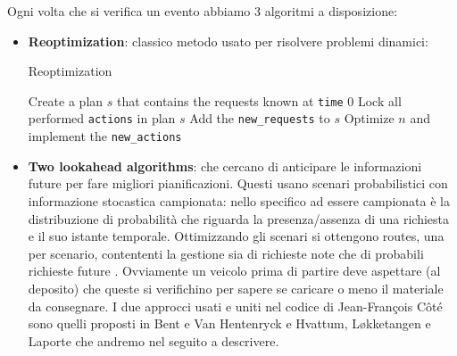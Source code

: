 \documentclass[
    article,            %
    12pt,                %
    oneside,            %
    a4paper,            %
    english,            %
    italian,                %
    sumario=tradicional,
]{abntex2}
\begin{document}
Ogni volta che si verifica un evento abbiamo 3 algoritmi a disposizione:

\begin{itemize}
\item
  \textbf{Reoptimization}: classico metodo usato per risolvere problemi
  dinamici: 
  \begin{algorithm}
        \caption{Reoptimization}
        \begin{algorithmic}
        \label{alg:Reoptimization}
            \State Create a plan $s$ that contains the requests known at \texttt{time} $0$
                \State Lock all performed \texttt{actions} in plan $s$
                \State Add the \texttt{new\_requests} to $s$
                \State Optimize $n$ and implement the \texttt{new\_actions}
            \EndWhile
        \end{algorithmic}
    \end{algorithm}
\item
  \textbf{Two lookahead algorithms}: che cercano di anticipare le
  informazioni future per fare migliori pianificazioni. Questi usano
  scenari probabilistici con informazione stocastica campionata: nello specifico ad essere campionata è la distribuzione di probabilità che riguarda la presenza/assenza di una richiesta e il suo istante temporale. Ottimizzando gli scenari si ottengono routes, una per scenario, contententi la gestione sia di richieste note che di probabili richieste future . Ovviamente un veicolo prima di partire deve aspettare (al deposito) che queste si verifichino per sapere se caricare o meno il materiale da consegnare. I due approcci usati e uniti nel codice di Jean-François Côté sono quelli proposti in Bent e Van Hentenryck\cite{SBPPDVR} e Hvattum, Løkketangen e Laporte \cite{BRH} che andremo nel seguito a descrivere.
\end{itemize}
\end{document}
